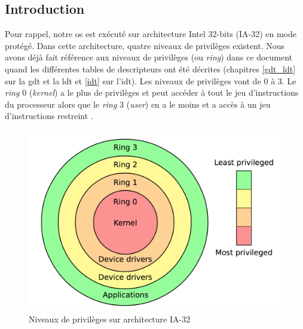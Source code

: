 
\subsection{Introduction}
Pour rappel, notre \acrshort{os} est exécuté sur architecture Intel 32-bits (\acrshort{IA-32})
en mode protégé. Dans cette architecture, quatre niveaux de privilèges existent.
Nous avons déjà fait référence aux niveaux de privilèges (ou \textit{ring})
dans ce document quand les différentes tables de descripteurs ont été décrites
(chapitres \ref{gdt_ldt} sur la \acrshort{gdt} et la \acrshort{ldt} et \ref{idt}
sur l'\acrshort{idt}). Les niveaux de privilèges vont de 0 à 3. Le \textit{ring}
0 (\textit{kernel}) a le plus de privilèges et peut accéder à tout le jeu d'instructions
du processeur alors que le \textit{ring} 3 (\textit{user}) en a le moins et a accès
à un jeu d'instructions restreint \cite{ref42}.

\begin{figure}[!h]
  \centering
  \includegraphics[scale=.4]{images/rings.png}
  \caption{Niveaux de privilèges sur architecture \acrshort{IA-32}}
  \label{gdt}
\end{figure}

